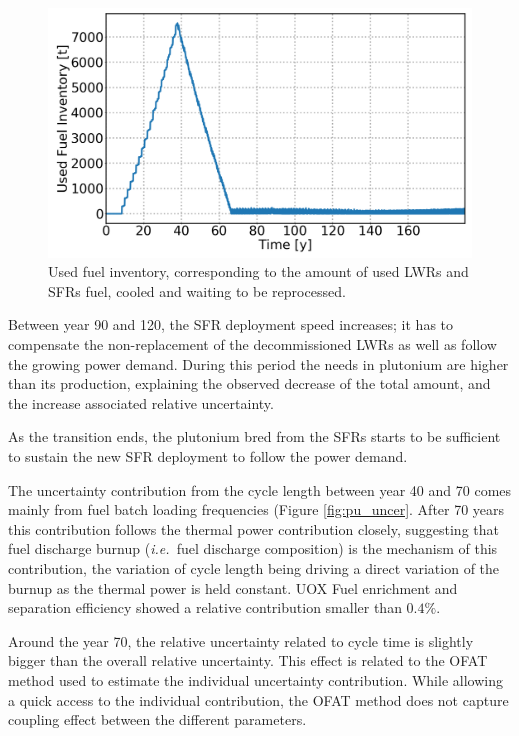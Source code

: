 \documentclass{anstrans}
\newcommand{\ie}{\emph{i.e.\ }}
\begin{document}
\begin{figure}[t] %
    \centering
    \includegraphics[scale=0.16]{used_fuel}
    \caption{Used fuel inventory, corresponding to the amount of used
    \glspl{LWR} and \glspl{SFR} fuel, cooled and waiting to be reprocessed.}
    \label{fig:used_fuel}
\end{figure}

Between year 90 and 120, the \gls{SFR} deployment speed increases; it has to
compensate the non-replacement of the decommissioned \glspl{LWR} as well as
follow the growing power demand.  During this period the needs in plutonium are
higher than its production, explaining the observed decrease of the total
amount, and the increase associated relative uncertainty.

As the transition ends, the plutonium bred from the \glspl{SFR} starts to be
sufficient to sustain the new \gls{SFR} deployment to follow the power demand.

The uncertainty contribution from the cycle length between year 40 and 70 comes
mainly from fuel batch loading frequencies (Figure \ref{fig:pu_uncer}.  After 70
years this contribution follows the thermal power contribution closely,
suggesting that fuel discharge burnup (\ie fuel discharge composition) is the
mechanism of this contribution, the variation of cycle length being driving a
direct variation of the burnup as the thermal power is held constant.  \gls{UOX}
Fuel enrichment and separation efficiency showed a relative contribution smaller
than $0.4\%$.

Around the year 70, the relative uncertainty related to cycle time is slightly
bigger than the overall relative uncertainty. This effect is related to the
\gls{OFAT} method used to estimate the individual uncertainty contribution.
While allowing a quick access to the individual contribution, the \gls{OFAT}
method does not capture coupling effect between the different parameters.
\end{document}
